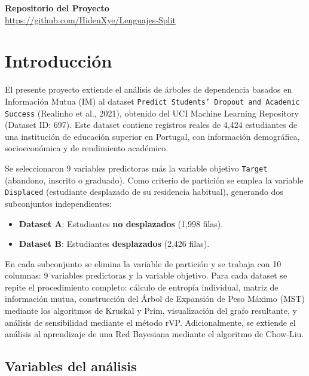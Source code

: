 \documentclass[12pt,a4paper]{article}
\begin{document}
\newpage
\tableofcontents
\newpage

\thispagestyle{empty}
\begin{center}
    \textbf{Repositorio del Proyecto}\\
    \url{https://github.com/HidenXye/Lenguajes-Split}
\end{center}
\newpage

\section{Introducción}

El presente proyecto extiende el análisis de árboles de dependencia basados en Información Mutua (IM) al dataset \texttt{Predict Students' Dropout and Academic Success} (Realinho et al., 2021), obtenido del UCI Machine Learning Repository (Dataset ID: 697). Este dataset contiene registros reales de 4,424 estudiantes de una institución de educación superior en Portugal, con información demográfica, socioeconómica y de rendimiento académico.

Se seleccionaron 9 variables predictoras más la variable objetivo \texttt{Target} (abandono, inscrito o graduado). Como criterio de partición se emplea la variable \texttt{Displaced} (estudiante desplazado de su residencia habitual), generando dos subconjuntos independientes:

\begin{itemize}
    \item \textbf{Dataset A}: Estudiantes \textbf{no desplazados} (1,998 filas).
    \item \textbf{Dataset B}: Estudiantes \textbf{desplazados} (2,426 filas).
\end{itemize}

En cada subconjunto se elimina la variable de partición y se trabaja con 10 columnas: 9 variables predictoras y la variable objetivo. Para cada dataset se repite el procedimiento completo: cálculo de entropía individual, matriz de información mutua, construcción del Árbol de Expansión de Peso Máximo (MST) mediante los algoritmos de Kruskal y Prim, visualización del grafo resultante, y análisis de sensibilidad mediante el método rVP. Adicionalmente, se extiende el análisis al aprendizaje de una Red Bayesiana mediante el algoritmo de Chow-Liu.

\subsection{Variables del análisis}
\end{document}
